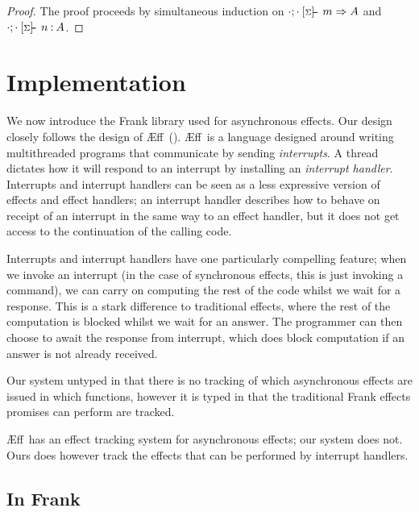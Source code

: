 \documentclass[msc,deptreport,cs]{infthesis} %
\newcommand\aeff{{\AE}ff\xspace}
\newcommand{\sigentails}[1]{\mathbin{[{\text{\scriptsize ${#1}$}}]\hspace{-0.4ex}\text{-\!-}}\,}
\newcommand{\inferbase}[5]{#1; #3 \mathbin{#2} {#4} \Rightarrow {#5}}
\newcommand{\checkbase}[5]{#1; #3 \mathbin{#2} #5 \mathbin{:} #4}
\newcommand{\makes}[5]{\inferbase{#1}{\sigentails{#3}}{#2}{#4}{#5}}
\newcommand{\has}[5]{\checkbase{#1}{\sigentails{#3}}{#2}{#4}{#5}}
\newcommand{\infers}{\makes}
\newcommand{\checks}{\has}
\newcommand{\sigs}{\Sigma}
\begin{document}
\begin{proof}
The proof proceeds by simultaneous induction on
$\infers{\cdot}{\cdot}{\sigs}{m}{A}$ and $\checks{\cdot}{\cdot}{\sigs}{A}{n}$.
\end{proof}


\chapter{Implementation}
\label{chap:Implementation}

We now introduce the Frank library used for asynchronous effects.
%
Our design closely follows the design of \aeff~(\cite{ahman2020asynchronous}).
\aeff~is a language designed around writing multithreaded programs that
communicate by sending \emph{interrupts}. A thread dictates how it will respond
to an interrupt by installing an \emph{interrupt handler}.
%
Interrupts and interrupt handlers can be seen as a less expressive version of
effects and effect handlers; an interrupt handler describes how to behave on
receipt of an interrupt in the same way to an effect handler, but it does not
get access to the continuation of the calling code.

Interrupts and interrupt handlers have one particularly compelling feature; when
we invoke an interrupt (in the case of synchronous effects, this is just
invoking a command), we can carry on computing the rest of the code whilst we
wait for a response. This is a stark difference to traditional effects, where
the rest of the computation is blocked whilst we wait for an answer. The
programmer can then choose to await the response from interrupt, which does
block computation if an answer is not already received.

Our system untyped in that there is no tracking of which asynchronous effects are
issued in which functions, however it is typed in that the traditional Frank
effects promises can perform are tracked.

\aeff~has an effect tracking system for asynchronous effects; our system does
not. Ours does however track the effects that can be performed by interrupt
handlers.

\section{In Frank}
\end{document}
